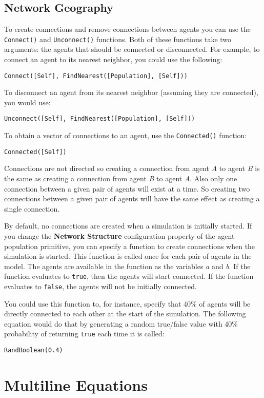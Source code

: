 \documentclass[]{memoir}
\renewcommand{\a}[1]{\textbf{#1}}
\begin{document}
\subsection{Network Geography}

To create connections and remove connections between agents you can use
the \lstinline!Connect()! and \lstinline!Unconnect()! functions. Both of
these functions take two arguments: the agents that should be connected
or disconnected. For example, to connect an agent to its nearest
neighbor, you could use the following:

\lstinline!Connect([Self], FindNearest([Population], [Self]))!

To disconnect an agent from its nearest neighbor (assuming they are
connected), you would use:

\lstinline!Unconnect([Self], FindNearest([Population], [Self]))!

To obtain a vector of connections to an agent, use the
\lstinline!Connected()! function:

\lstinline!Connected([Self])!

Connections are not directed so creating a connection from agent
\emph{A} to agent \emph{B} is the same as creating a connection from
agent \emph{B} to agent \emph{A}. Also only one connection between a
given pair of agents will exist at a time. So creating two connections
between a given pair of agents will have the same effect as creating a
single connection.

By default, no connections are created when a simulation is initially
started. If you change the \a{Network Structure} configuration property
of the agent population primitive, you can specify a function to create
connections when the simulation is started. This function is called once
for each pair of agents in the model. The agents are available in the
function as the variables \emph{a} and \emph{b}. If the function
evaluates to \lstinline!true!, then the agents will start connected. If
the function evaluates to \lstinline!false!, the agents will not be
initially connected.

You could use this function to, for instance, specify that 40\% of
agents will be directly connected to each other at the start of the
simulation. The following equation would do that by generating a random
true/false value with 40\% probability of returning \lstinline!true!
each time it is called:

\lstinline!RandBoolean(0.4)!

\section{Multiline Equations}
\end{document}
